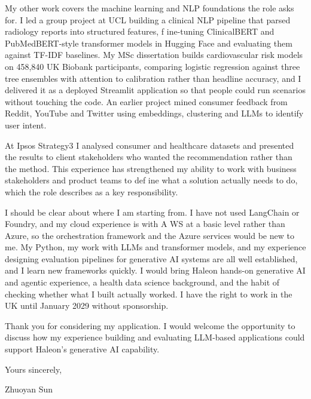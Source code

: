 \documentclass[letterpaper,11pt]{article}
\begin{document}
My other work covers the machine learning and NLP foundations the role asks for. I led a group project at UCL building a clinical NLP pipeline that parsed radiology reports into structured features, f\kern0pt ine-tuning ClinicalBERT and PubMedBERT-style transformer models in Hugging Face and evaluating them against TF-IDF baselines. My MSc dissertation builds cardiovascular risk models on 458,840 UK Biobank participants, comparing logistic regression against three tree ensembles with attention to calibration rather than headline accuracy, and I delivered it as a deployed Streamlit application so that people could run scenarios without touching the code. An earlier project mined consumer feedback from Reddit, YouTube and Twitter using embeddings, clustering and LLMs to identify user intent.

At Ipsos Strategy3 I analysed consumer and healthcare datasets and presented the results to client stakeholders who wanted the recommendation rather than the method. This experience has strengthened my ability to work with business stakeholders and product teams to def\kern0pt ine what a solution actually needs to do, which the role describes as a key responsibility.

I should be clear about where I am starting from. I have not used LangChain or Foundry, and my cloud experience is with A\kern0pt WS at a basic level rather than Azure, so the orchestration framework and the Azure services would be new to me. My Python, my work with LLMs and transformer models, and my experience designing evaluation pipelines for generative AI systems are all well established, and I learn new frameworks quickly. I would bring Haleon hands-on generative AI and agentic experience, a health data science background, and the habit of checking whether what I built actually worked. I have the right to work in the UK until January 2029 without sponsorship.

Thank you for considering my application. I would welcome the opportunity to discuss how my experience building and evaluating LLM-based applications could support Haleon's generative AI capability.

\vspace{2pt}
Yours sincerely,

\vspace{8pt}
Zhuoyan Sun
\end{document}
